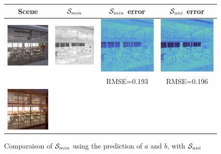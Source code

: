 \documentclass{classeENS}
\begin{document}
\begin{figure}[H]
    \centering
    \caption{Comparaison of $\mathcal S_{min}$ using the prediction of $a$ and $b$, with $\mathcal S_{uni}$}
    \begin{tabular}{|c|c|c|c|}
        \hline
        Scene & $\mathcal S_{min}$ & $\mathcal S_{min}$ error & $\mathcal S_{uni}$ error\\
        \hline
        \includegraphics[width=35mm]{image/without/pimage.png}
        & \includegraphics[width=35mm]{image/without/psm.png}
        & \includegraphics[width=35mm]{image/without/perror.png}
        & \includegraphics[width=35mm]{image/without/RMSE_uni.png} \\
         &  & RMSE=0.193 & RMSE=0.196 \\
        \hline
        \includegraphics[width=35mm]{image/without/ppgt.png}

\end{tabular}
\end{figure}
\end{document}
